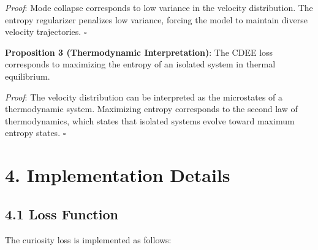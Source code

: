 \documentclass[12pt]{article}
\begin{document}
\textit{Proof}: Mode collapse corresponds to low variance in the velocity distribution. The entropy regularizer penalizes low variance, forcing the model to maintain diverse velocity trajectories. $\square$

\textbf{Proposition 3 (Thermodynamic Interpretation)}: The CDEE loss corresponds to maximizing the entropy of an isolated system in thermal equilibrium.

\textit{Proof}: The velocity distribution can be interpreted as the microstates of a thermodynamic system. Maximizing entropy corresponds to the second law of thermodynamics, which states that isolated systems evolve toward maximum entropy states. $\square$

\section{4. Implementation Details}

\subsection{4.1 Loss Function}

The curiosity loss is implemented as follows:
\end{document}
